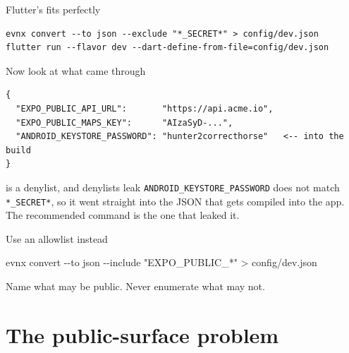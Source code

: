 \documentclass[aspectratio=169,10pt]{beamer}
\begin{document}
\begin{frame}[fragile]{Flutter's  fits perfectly}

  \vspace{0.4em}
\begin{lstlisting}[style=evnxcode]
evnx convert --to json --exclude "*_SECRET*" > config/dev.json
flutter run --flavor dev --dart-define-from-file=config/dev.json
\end{lstlisting}

  \vspace{0.3em}
\end{frame}

\begin{frame}[fragile]{Now look at what came through}
\begin{lstlisting}[style=evnxcode]
{
  "EXPO_PUBLIC_API_URL":       "https://api.acme.io",
  "EXPO_PUBLIC_MAPS_KEY":      "AIzaSyD-...",
  "ANDROID_KEYSTORE_PASSWORD": "hunter2correcthorse"   <-- into the build
}
\end{lstlisting}

  \vspace{0.6em}
  \begin{trap}{ is a denylist, and denylists leak}
    \texttt{ANDROID\_KEYSTORE\_PASSWORD} does not match \texttt{*\_SECRET*}, so
    it went straight into the JSON that gets compiled into the app. The
    recommended command is the one that leaked it.
  \end{trap}

  \vspace{0.5em}
  \begin{block}{Use an allowlist instead}
    \begin{center}\ttfamily\small
    evnx convert -{}-to json -{}-include "EXPO\_PUBLIC\_*" > config/dev.json
    \end{center}
    Name what may be public. Never enumerate what may not.
  \end{block}
\end{frame}

\section{The public-surface problem}
\end{document}
